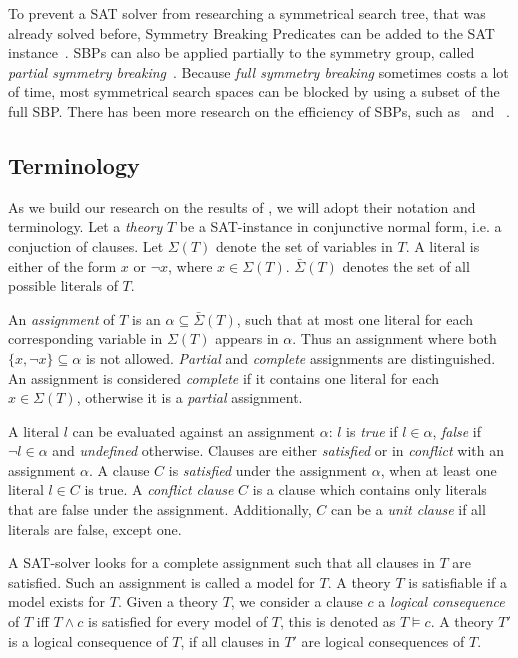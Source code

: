 To prevent a SAT solver from researching a symmetrical search tree, that was already solved
before, Symmetry Breaking Predicates can be added to the SAT
instance~\cite{sakallah2009symmetry}. SBPs can also be applied partially to the symmetry
group, called \textit{partial symmetry breaking}~\cite{sakallah2009symmetry}. Because
\textit{full symmetry breaking} sometimes costs a lot of time, most symmetrical search
spaces can be blocked by using a subset of the full SBP. There has been more research on
the efficiency of SBPs, such as~\cite{aloul2006efficient,aloul2003shatter,crawford1996symmetry} and ~\cite{sabharwal2005symchaff}.

\subsection{Terminology}
	As we build our research on the results of \cite{devriendt2012symmetry}, we will adopt
	their notation and terminology.
	Let a \emph{theory} $T$ be a SAT-instance in conjunctive normal form, i.e. a conjuction
	of clauses.
	Let $\Sigma(T)$ denote the set of variables in $T$.
	A literal is either of the form	$x$ or $\neg x$, where $x \in \Sigma(T)$.
	$\bar\Sigma(T)$ denotes the set of all possible literals of $T$.

	An \emph{assignment} of $T$ is an $\alpha \subseteq \bar\Sigma(T)$, such that at most
	one literal for each corresponding variable in $\Sigma(T)$ appears in $\alpha$.
	Thus an assignment where both $\{x, \neg x\} \subseteq \alpha$ is not allowed.
	\emph{Partial} and \emph{complete} assignments are distinguished.
	An assignment is considered \emph{complete} if it contains one literal for each $x \in \Sigma(T)$,
	otherwise it is a \emph{partial} assignment.

	A literal $l$ can be evaluated against an assignment $\alpha$: $l$ is \emph{true} if $l \in
	\alpha$, \emph{false} if $\neg l \in \alpha$ and \emph{undefined} otherwise.
	Clauses are either \emph{satisfied} or in \emph{conflict} with an assignment $\alpha$.
	A clause $C$ is \emph{satisfied} under the assignment $\alpha$,
	when at least one literal $l \in C$ is true.
	A \emph{conflict clause} $C$ is a clause which contains only literals that are false under the assignment.
	Additionally, $C$ can be a \emph{unit clause} if all literals are false, except one.

	A SAT-solver looks for a complete assignment such that all clauses in $T$ are satisfied.
	Such an assignment is called a model for $T$.
	A theory $T$ is satisfiable if a model exists for $T$.
	Given a theory $T$, we consider a clause $c$ a \emph{logical consequence} of $T$ iff
	$T \wedge c$ is satisfied for every model of $T$, this is denoted as $T \models c$.
	A theory $T'$ is a logical consequence of $T$, if all clauses in $T'$ are logical
	consequences of $T$.

